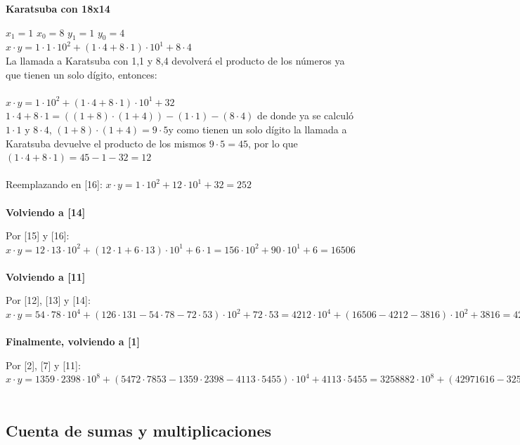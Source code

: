 \documentclass[titlepage,a4paper]{article}
\begin{document}
\textbf{Karatsuba con 18x14} \par
\qquad $x_1=1$ \quad $x_0=8$ \quad $y_1=1$ \quad $y_0=4$ \\
$x\cdot y= 1 \cdot 1 \cdot 10^2 + (1\cdot 4 + 8 \cdot 1)\cdot 10^1 + 8\cdot 4 $ \\

La llamada a Karatsuba con 1,1 y 8,4 devolverá el producto de los números ya que tienen un solo dígito, entonces: \\ \\
$x\cdot y = 1 \cdot 10^2 + (1\cdot 4 + 8 \cdot 1)\cdot 10^1 + 32 $ \qquad [16] \\

$1\cdot 4 + 8 \cdot 1 = ((1+8)\cdot (1+4)) - (1\cdot 1) - (8\cdot 4) $ de donde ya se calculó $1 \cdot 1$ y $ 8 \cdot 4 $, $ (1+8)\cdot (1+4) = 9 \cdot 5 $y como tienen un solo dígito la llamada a Karatsuba devuelve el producto de los mismos $9\cdot5=45$, por lo que $(1\cdot 4 + 8 \cdot 1) = 45 - 1 - 32 = 12 $ \\ \\ 
Reemplazando en [16]: \qquad $ x\cdot y= 1 \cdot 10^2 + 12\cdot 10^1 + 32 = 252 $ \\ \\


\textbf{Volviendo a [14]} \par
Por [15] y [16]: $x\cdot y= 12 \cdot 13 \cdot 10^2 + (12\cdot 1 + 6 \cdot 13)\cdot 10^1 + 6\cdot 1 = 156 \cdot 10^2 +  90\cdot 10^1 + 6 = 16506 $ \\ \\


\textbf{Volviendo a [11]} \par
Por [12], [13] y [14]: $ x\cdot y= 54 \cdot 78 \cdot 10^4 + (126 \cdot 131 - 54\cdot 78 - 72\cdot 53)\cdot 10^2 + 72\cdot 53 = 4212 \cdot 10^4 + (16506 - 4212 - 3816)\cdot 10^2 + 3816 = 42971616 $ \\ \\


\textbf{Finalmente, volviendo a [1]} \par
Por [2], [7] y [11]: $ x\cdot y= 1359 \cdot 2398 \cdot 10^8 + ( 5472\cdot7853 - 1359\cdot 2398 - 4113\cdot 5455)\cdot 10^4 + 4113\cdot 5455 = 3258882\cdot 10^8 + (42971616 -3258882-22436415) \cdot 10^4 +22436415 = 326060985626415$ \\ \\


\newpage
\subsection{Cuenta de sumas y multiplicaciones}
\end{document}
